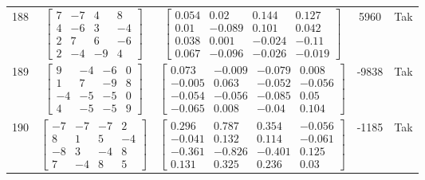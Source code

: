 \documentclass[a4paper,12pt]{article}
\begin{document}
\begin{tabular}{c c c c c}
188
&
$\begin{bmatrix} 7 & -7 & 4 & 8 \\ 4 & -6 & 3 & -4 \\ 2 & 7 & 6 & -6 \\ 2 & -4 & -9 & 4 \end{bmatrix}$
&
$\begin{bmatrix} 0.054 & 0.02 & 0.144 & 0.127 \\ 0.01 & -0.089 & 0.101 & 0.042 \\ 0.038 & 0.001 & -0.024 & -0.11 \\ 0.067 & -0.096 & -0.026 & -0.019 \end{bmatrix}$
&
5960
&
Tak
\\
189
&
$\begin{bmatrix} 9 & -4 & -6 & 0 \\ 1 & 7 & -9 & 8 \\ -4 & -5 & -5 & 0 \\ 4 & -5 & -5 & 9 \end{bmatrix}$
&
$\begin{bmatrix} 0.073 & -0.009 & -0.079 & 0.008 \\ -0.005 & 0.063 & -0.052 & -0.056 \\ -0.054 & -0.056 & -0.085 & 0.05 \\ -0.065 & 0.008 & -0.04 & 0.104 \end{bmatrix}$
&
-9838
&
Tak
\\
190
&
$\begin{bmatrix} -7 & -7 & -7 & 2 \\ 8 & 1 & 5 & -4 \\ -8 & 3 & -4 & 8 \\ 7 & -4 & 8 & 5 \end{bmatrix}$
&
$\begin{bmatrix} 0.296 & 0.787 & 0.354 & -0.056 \\ -0.041 & 0.132 & 0.114 & -0.061 \\ -0.361 & -0.826 & -0.401 & 0.125 \\ 0.131 & 0.325 & 0.236 & 0.03 \end{bmatrix}$
&
-1185
&
Tak
\\
\end{tabular} \egroup \newpage
\end{document}
